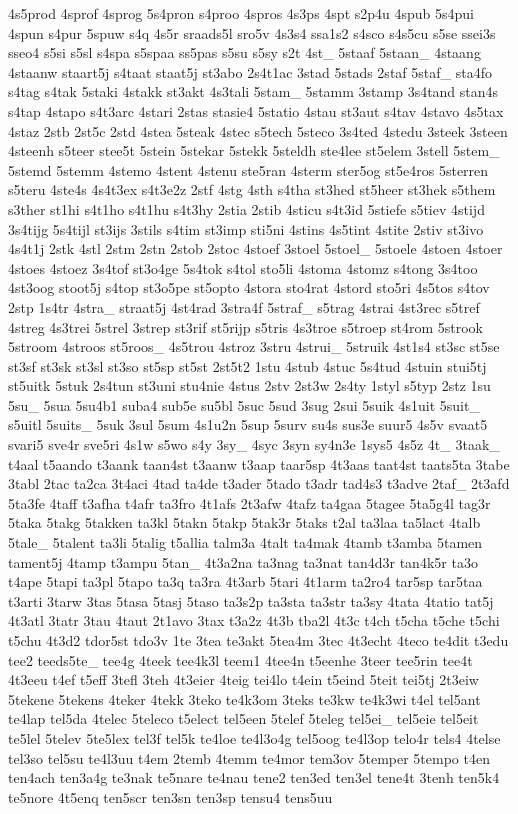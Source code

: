 {4s5prod 4sprof 4sprog 5s4pron s4proo 4spros 4s3ps 4spt s2p4u 4spub 5s4pui 4spun s4pur 5spuw s4q 4s5r sraads5l sro5v 4s3s4 ssa1s2 s4sco s4s5cu s5se ssei3s sseo4 s5si s5sl s4spa s5spaa ss5pas s5su s5sy s2t 4st\-\_\- 5staaf 5staan\-\_\- 4staang 4staanw staart5j s4taat staat5j st3abo 2s4t1ac 3stad 5stads 2staf 5staf\-\_\- sta4fo s4tag s4tak 5staki 4stakk st3akt 4s3tali 5stam\-\_\- 5stamm 3stamp 3s4tand stan4s s4tap 4stapo s4t3arc 4stari 2stas stasie4 5statio 4stau st3aut s4tav 4stavo 4s5tax 4staz 2stb 2st5c 2std 4stea 5steak 4stec s5tech 5steco 3s4ted 4stedu 3steek 3steen 4steenh s5teer stee5t 5stein 5stekar 5stekk 5steldh ste4lee st5elem 3stell 5stem\-\_\- 5stemd 5stemm 4stemo 4stent 4stenu ste5ran 4sterm ster5og st5e4ros 5sterren s5teru 4ste4s 4s4t3ex s4t3e2z 2stf 4stg 4sth s4tha st3hed st5heer st3hek s5them s3ther st1hi s4t1ho s4t1hu s4t3hy 2stia 2stib 4sticu s4t3id 5stiefe s5tiev 4stijd 3s4tijg 5s4tijl st3ijs 3stils s4tim st3imp sti5ni 4stins 4s5tint 4stite 2stiv st3ivo 4s4t1j 2stk 4stl 2stm 2stn 2stob 2stoc 4stoef 3stoel 5stoel\-\_\- 5stoele 4stoen 4stoer 4stoes 4stoez 3s4tof st3o4ge 5s4tok s4tol sto5li 4stoma 4stomz s4tong 3s4too 4st3oog stoot5j s4top st3o5pe st5opto 4stora sto4rat 4stord sto5ri 4s5tos s4tov 2stp 1s4tr 4stra\-\_\- straat5j 4st4rad 3stra4f 5straf\-\_\- s5trag 4strai 4st3rec s5tref 4streg 4s3trei 5strel 3strep st3rif st5rijp s5tris 4s3troe s5troep st4rom 5strook 5stroom 4stroos st5roos\-\_\- 4s5trou 4stroz 3stru 4strui\-\_\- 5struik 4st1s4 st3sc st5se st3sf st3sk st3sl st3so st5sp st5st 2st5t2 1stu 4stub 4stuc 5s4tud 4stuin stui5tj st5uitk 5stuk 2s4tun st3uni stu4nie 4stus 2stv 2st3w 2s4ty 1styl s5typ 2stz 1su 5su\-\_\- 5sua 5su4b1 suba4 sub5e su5bl 5suc 5sud 3sug 2sui 5suik 4s1uit 5suit\-\_\- s5uitl 5suits\-\_\- 5suk 3sul 5sum 4s1u2n 5sup 5surv su4s sus3e suur5 4s5v svaat5 svari5 sve4r sve5ri 4s1w s5wo s4y 3sy\-\_\- 4syc 3syn sy4n3e 1sys5 4s5z 4t\-\_\- 3taak\-\_\- t4aal t5aando t3aank taan4st t3aanw t3aap taar5sp 4t3aas taat4st taats5ta 3tabe 3tabl 2tac ta2ca 3t4aci 4tad ta4de t3ader 5tado t3adr tad4s3 t3adve 2taf\-\_\- 2t3afd 5ta3fe 4taff t3afha t4afr ta3fro 4t1afs 2t3afw 4tafz ta4gaa 5tagee 5ta5g4l tag3r 5taka 5takg 5takken ta3kl 5takn 5takp 5tak3r 5taks t2al ta3laa ta5lact 4talb 5tale\-\_\- 5talent ta3li 5talig t5allia talm3a 4talt ta4mak 4tamb t3amba 5tamen tament5j 4tamp t3ampu 5tan\-\_\- 4t3a2na ta3nag ta3nat tan4d3r tan4k5r ta3o t4ape 5tapi ta3pl 5tapo ta3q ta3ra 4t3arb 5tari 4t1arm ta2ro4 tar5sp tar5taa t3arti 3tarw 3tas 5tasa 5tasj 5taso ta3s2p ta3sta ta3str ta3sy 4tata 4tatio tat5j 4t3atl 3tatr 3tau 4taut 2t1avo 3tax t3a2z 4t3b tba2l 4t3c t4ch t5cha t5che t5chi t5chu 4t3d2 tdor5st tdo3v 1te 3tea te3akt 5tea4m 3tec 4t3echt 4teco te4dit t3edu tee2 teeds5te\-\_\- tee4g 4teek tee4k3l teem1 4tee4n t5eenhe 3teer tee5rin tee4t 4t3eeu t4ef t5eff 3tefl 3teh 4t3eier 4teig tei4lo t4ein t5eind 5teit tei5tj 2t3eiw 5tekene 5tekens 4teker 4tekk 3teko te4k3om 3teks te3kw te4k3wi t4el tel5ant te4lap tel5da 4telec 5teleco t5elect tel5een 5telef 5teleg tel5ei\-\_\- tel5eie tel5eit te5lel 5telev 5te5lex tel3f tel5k te4loe te4l3o4g tel5oog te4l3op telo4r tels4 4telse tel3so tel5su te4l3uu t4em 2temb 4temm te4mor tem3ov 5temper 5tempo t4en ten4ach ten3a4g te3nak te5nare te4nau tene2 ten3ed ten3el tene4t 3tenh ten5k4 te5nore 4t5enq ten5scr ten3sn ten3sp tensu4 tens5uu }
